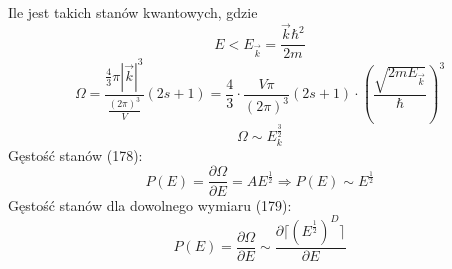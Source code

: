 \documentclass{article}
\begin{document}
		\paragraph{} Ile jest takich stanów kwantowych, gdzie
		\begin{equation}
			E < E_{\vec{k}} = \frac{\vec{k}\hbar^2}{2m}
		\end{equation}
		\begin{equation}
		\Omega = \frac{\frac{4}{3}\pi |\vec{k}|^3}{\frac{(2\pi)^3}{V}}(2s + 1) = \frac{4}{3} \cdot \frac{V\pi}{(2\pi)^3}(2s + 1)\cdot (\frac{\sqrt{2mE_{\vec{k}}}}{\hbar})^3
		\end{equation}
		\begin{equation}
		\Omega \sim E_k^{\frac{3}{2}}
		\end{equation}
		Gęstość stanów (178): 
		\begin{equation}
		P(E) = \frac{\partial \Omega}{\partial E} = AE^{\frac{1}{2}} 
		\Rightarrow P(E) \sim E^{\frac{1}{2}}
		\end{equation}
		Gęstość stanów dla dowolnego wymiaru (179): 
		\begin{equation}
			P(E) = \frac{\partial \Omega}{\partial E} \sim 
			\frac{\partial \lceil (E^{\frac{1}{2}})^D\rceil}{\partial E}
		\end{equation}
\end{document}
